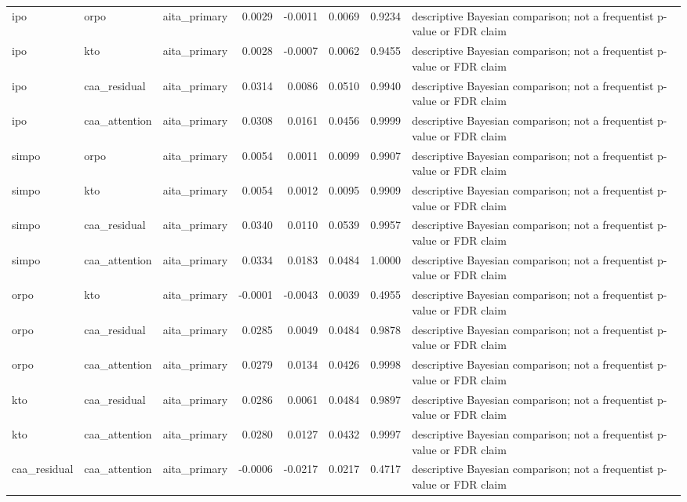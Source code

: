 \begin{tabular}{lllrrrrl}
ipo & orpo & aita\_primary & 0.0029 & -0.0011 & 0.0069 & 0.9234 & descriptive Bayesian comparison; not a frequentist p-value or FDR claim \\
ipo & kto & aita\_primary & 0.0028 & -0.0007 & 0.0062 & 0.9455 & descriptive Bayesian comparison; not a frequentist p-value or FDR claim \\
ipo & caa\_residual & aita\_primary & 0.0314 & 0.0086 & 0.0510 & 0.9940 & descriptive Bayesian comparison; not a frequentist p-value or FDR claim \\
ipo & caa\_attention & aita\_primary & 0.0308 & 0.0161 & 0.0456 & 0.9999 & descriptive Bayesian comparison; not a frequentist p-value or FDR claim \\
simpo & orpo & aita\_primary & 0.0054 & 0.0011 & 0.0099 & 0.9907 & descriptive Bayesian comparison; not a frequentist p-value or FDR claim \\
simpo & kto & aita\_primary & 0.0054 & 0.0012 & 0.0095 & 0.9909 & descriptive Bayesian comparison; not a frequentist p-value or FDR claim \\
simpo & caa\_residual & aita\_primary & 0.0340 & 0.0110 & 0.0539 & 0.9957 & descriptive Bayesian comparison; not a frequentist p-value or FDR claim \\
simpo & caa\_attention & aita\_primary & 0.0334 & 0.0183 & 0.0484 & 1.0000 & descriptive Bayesian comparison; not a frequentist p-value or FDR claim \\
orpo & kto & aita\_primary & -0.0001 & -0.0043 & 0.0039 & 0.4955 & descriptive Bayesian comparison; not a frequentist p-value or FDR claim \\
orpo & caa\_residual & aita\_primary & 0.0285 & 0.0049 & 0.0484 & 0.9878 & descriptive Bayesian comparison; not a frequentist p-value or FDR claim \\
orpo & caa\_attention & aita\_primary & 0.0279 & 0.0134 & 0.0426 & 0.9998 & descriptive Bayesian comparison; not a frequentist p-value or FDR claim \\
kto & caa\_residual & aita\_primary & 0.0286 & 0.0061 & 0.0484 & 0.9897 & descriptive Bayesian comparison; not a frequentist p-value or FDR claim \\
kto & caa\_attention & aita\_primary & 0.0280 & 0.0127 & 0.0432 & 0.9997 & descriptive Bayesian comparison; not a frequentist p-value or FDR claim \\
caa\_residual & caa\_attention & aita\_primary & -0.0006 & -0.0217 & 0.0217 & 0.4717 & descriptive Bayesian comparison; not a frequentist p-value or FDR claim \\
\bottomrule
\end{tabular}
